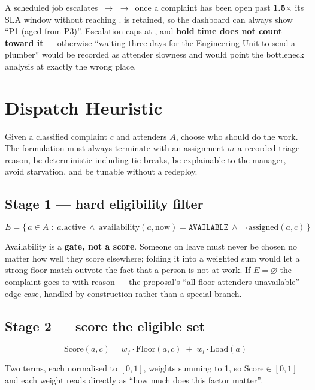 \documentclass[10pt,a4paper]{article}
\begin{document}
A scheduled job escalates \,$\rightarrow$\,\,$\rightarrow$\, once a
complaint has been open past \textbf{1.5$\times$} its SLA window without reaching .
 is retained, so the dashboard can always show ``P1 (aged from P3)''.
Escalation caps at , and \textbf{hold time does not count toward it} --- otherwise
``waiting three days for the Engineering Unit to send a plumber'' would be recorded as attender
slowness and would point the bottleneck analysis at exactly the wrong place.

\section{Dispatch Heuristic}

Given a classified complaint $c$ and attenders $A$, choose who should do the work. The formulation
must always terminate with an assignment \emph{or} a recorded triage reason, be deterministic
including tie-breaks, be explainable to the manager, avoid starvation, and be tunable without a
redeploy.

\subsection{Stage 1 --- hard eligibility filter}

\[ E=\{\,a\in A \;:\; a.\mathrm{active}\ \wedge\ \mathrm{availability}(a,\mathrm{now})=\texttt{AVAILABLE}\ \wedge\ \neg\,\mathrm{assigned}(a,c)\,\} \]

Availability is a \textbf{gate, not a score}. Someone on leave must never be chosen no matter how
well they score elsewhere; folding it into a weighted sum would let a strong floor match outvote
the fact that a person is not at work. If $E=\varnothing$ the complaint goes to  with
reason  --- the proposal's ``all floor attenders unavailable'' edge
case, handled by construction rather than a special branch.

\subsection{Stage 2 --- score the eligible set}

\[ \mathrm{Score}(a,c)=w_f\!\cdot\!\mathrm{Floor}(a,c)\;+\;w_l\!\cdot\!\mathrm{Load}(a) \]

Two terms, each normalised to $[0,1]$, weights summing to 1, so $\mathrm{Score}\in[0,1]$ and each
weight reads directly as ``how much does this factor matter''.
\end{document}
